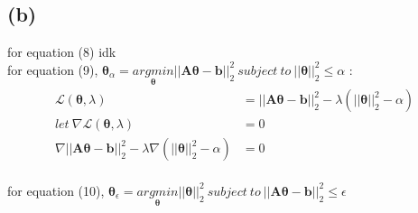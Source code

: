 \documentclass[11pt]{article}
\begin{document}
\subsection*{(b)}
for equation (8) idk\\
for equation (9), $\pmb{\theta}_\alpha=\underset{\pmb{\theta}}{argmin}||\pmb{A\theta}-\pmb{b}||^2_2 \ subject\ to\ ||\pmb{\theta}||^2_2\le\alpha$ :
\begin{equation}
\begin{split}
\mathcal{L}(\pmb{\theta},\lambda)&=||\pmb{A\theta}-\pmb{b}||^2_2-\lambda(||\pmb{\theta}||^2_2-\alpha)\\
let\ \nabla\mathcal{L}(\pmb{\theta},\lambda)&= 0\\
\nabla||\pmb{A\theta}-\pmb{b}||^2_2-\lambda\nabla(||\pmb{\theta}||^2_2-\alpha)&=0
\end{split}
\end{equation}\\
for equation (10),
$\pmb{\theta}_\epsilon=\underset{\pmb{\theta}}{argmin}||\pmb{\theta}||^2_2\ subject\ to\ ||\pmb{A\theta}-\pmb{b}||^2_2\le\epsilon$
\end{document}

